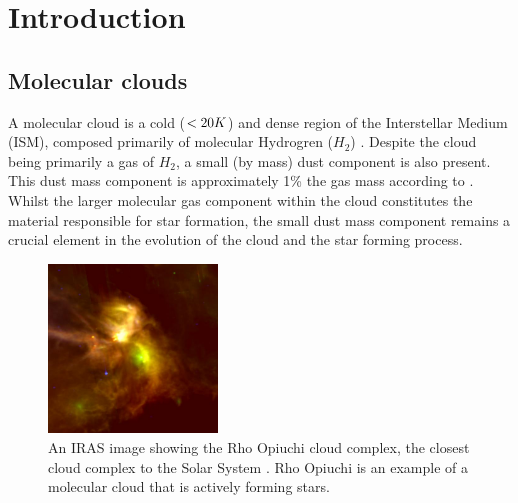 \documentclass{report}
\begin{document}

\tableofcontents %
\pagebreak %

\listoffigures

\listoftables


\chapter{Introduction}

\section{Molecular clouds}
A molecular cloud is a cold ($<20\/K$) and dense region of the Interstellar Medium (ISM), composed primarily of molecular Hydrogren ($H_{2}$) \parencite{dustopacity}. Despite the cloud being primarily a gas of $H_{2}$, a small (by mass) dust component is also present. This dust mass component is approximately 1\% the gas mass according to \textcite{noise}. Whilst the larger molecular gas component within the cloud constitutes the material responsible for star formation, the small dust mass component remains a crucial element in the evolution of the cloud and the star forming process.

\begin{figure}
  \begin{center}
    \includegraphics[width=0.4\textwidth]{../img/rho.jpg}
    \caption[An IRAS image showing the Rho Opiuchi cloud complex, the closest cloud complex to the Solar System \parencite{rho}. Rho Opiuchi is an example of a molecular cloud that is actively forming stars.]{An IRAS image showing the Rho Opiuchi cloud complex, the closest cloud complex to the Solar System \parencite{rho}. Rho Opiuchi is an example of a molecular cloud that is actively forming stars.}
    \label{fig:rho}
  \end{center}
\end{figure}
\end{document}
